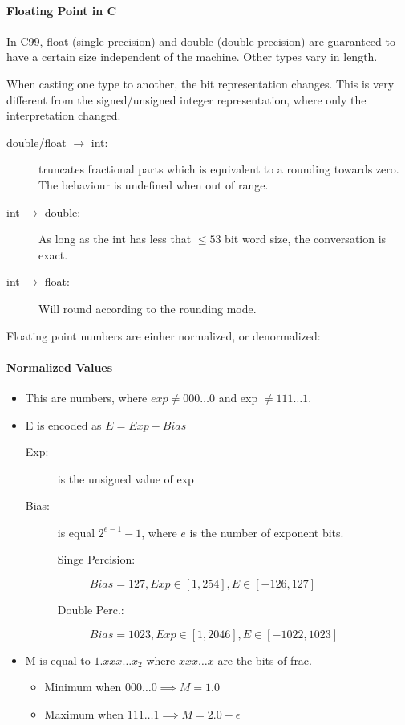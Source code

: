 \paragraph{Floating Point in C}
In C99, float (single precision) and double (double precision) are guaranteed to have a certain size independent of the machine. Other types vary in length.

When casting one type to another, the bit representation changes. This is very different from the signed/unsigned integer representation, where only the interpretation changed.
\begin{description}
    \item[double/float $\to$ int:] truncates fractional parts which is equivalent to a rounding towards zero. The behaviour is undefined when out of range.
    \item[int $\to$ double:] As long as the int has less that $\le 53$ bit word size, the conversation is exact.
    \item[int $\to$ float:] Will round according to the rounding mode.
\end{description}

Floating point numbers are einher normalized, or denormalized:
\paragraph{Normalized Values}

\begin{itemize}
    \item This are numbers, where $exp \neq 000 \dots 0$ and exp $\neq 111 \dots 1$.
    \item E is encoded as $E = Exp - Bias$ 
        \begin{description}
            \item[Exp:] is the unsigned value of exp
            \item[Bias:] is equal $2^{e-1} - 1$, where $e$ is the number of exponent bits.
                \begin{description}
                    \item[Singe Percision:] $Bias = 127, Exp \in [1, 254], E \in [-126, 127]$
                    \item[Double Perc.:] $Bias = 1023, Exp \in [1, 2046], E \in [-1022, 1023]$
                \end{description}
        \end{description}
    \item M is equal to $1.xxx \dots x_2$ where $xxx \dots x$ are the bits of frac.
        \begin{itemize}
            \item Minimum when $000 \dots 0 \implies M = 1.0$
            \item Maximum when $111 \dots 1 \implies M = 2.0 - \epsilon$
        \end{itemize}
\end{itemize}

